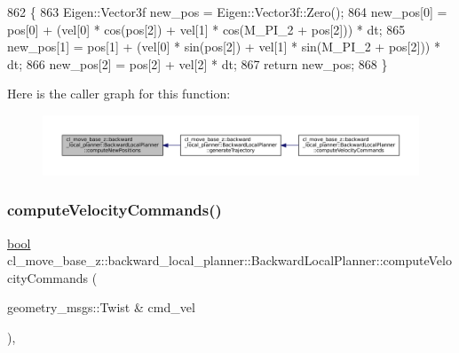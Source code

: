 \begin{DoxyCode}
862         \{
863             Eigen::Vector3f new\_pos = Eigen::Vector3f::Zero();
864             new\_pos[0] = pos[0] + (vel[0] * cos(pos[2]) + vel[1] * cos(M\_PI\_2 + pos[2])) * dt;
865             new\_pos[1] = pos[1] + (vel[0] * sin(pos[2]) + vel[1] * sin(M\_PI\_2 + pos[2])) * dt;
866             new\_pos[2] = pos[2] + vel[2] * dt;
867             \textcolor{keywordflow}{return} new\_pos;
868         \}
\end{DoxyCode}
Here is the caller graph for this function\+:
\nopagebreak
\begin{figure}[H]
\begin{center}
\leavevmode
\includegraphics[width=350pt]{classcl__move__base__z_1_1backward__local__planner_1_1BackwardLocalPlanner_a0fe2ebd23fd79e8b574127e819ef0e14_icgraph}
\end{center}
\end{figure}
\mbox{\label{classcl__move__base__z_1_1backward__local__planner_1_1BackwardLocalPlanner_a25437208766366ca22f967fe72e80988}} 
\subsubsection{\texorpdfstring{compute\+Velocity\+Commands()}{computeVelocityCommands()}}
{\footnotesize\ttfamily \hyperlink{classbool}{bool} cl\+\_\+move\+\_\+base\+\_\+z\+::backward\+\_\+local\+\_\+planner\+::\+Backward\+Local\+Planner\+::compute\+Velocity\+Commands (\begin{DoxyParamCaption}\item[{geometry\+\_\+msgs\+::\+Twist \&}]{cmd\+\_\+vel }\end{DoxyParamCaption})\hspace{0.3cm}{\ttfamily [override]}, {\ttfamily [virtual]}}



